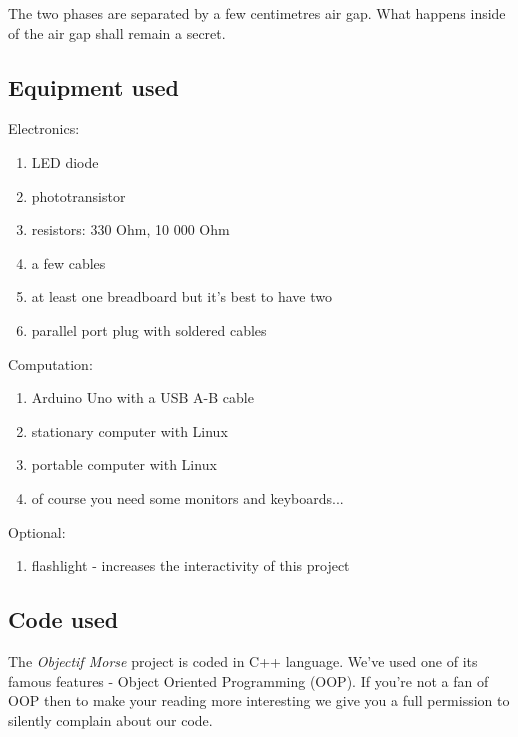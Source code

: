 \documentclass[12pt]{report}
\begin{document}
The two phases are separated by a few centimetres air gap. What happens inside of the air gap shall remain a secret.

\subsection{Equipment used} 

Electronics:

\begin{enumerate}

\item LED diode
\item phototransistor
\item resistors: 330 Ohm, 10 000 Ohm
\item a few cables
\item at least one breadboard but it's best to have two
\item parallel port plug with soldered cables

\end{enumerate}

Computation:

\begin{enumerate}

\item Arduino Uno with a USB A-B cable
\item stationary computer with Linux
\item portable computer with Linux
\item of course you need some monitors and keyboards...

\end{enumerate}

Optional:

\begin{enumerate}

\item flashlight - increases the interactivity of this project

\end{enumerate}

\newpage

\subsection{Code used}

The \textit{Objectif Morse} project is coded in C++ language. We've used one of its famous features - Object Oriented Programming (OOP). If you're not a fan of OOP then to make your reading more interesting we give you a full permission to silently complain about our code.
\end{document}
